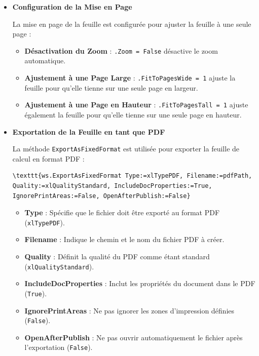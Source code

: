 \documentclass[a4paper, oneside, 12pt, final]{extreport}
\begin{document}
\begin{itemize}
La zone d'impression est définie pour couvrir l'ensemble de la plage utilisée dans la feuille de calcul :

\begin{lstlisting}
\texttt{ws.PageSetup.PrintArea = ws.UsedRange.Address}
\end{lstlisting}

Définit la zone d'impression de la feuille de calcul \texttt{ws} pour inclure toute la plage utilisée dans cette feuille. Cela garantit que toute la plage de données visible sera incluse dans le PDF exporté.

\item \textbf{Configuration de la Mise en Page}

La mise en page de la feuille est configurée pour ajuster la feuille à une seule page :

\begin{itemize}
    \item \textbf{Désactivation du Zoom} : \texttt{.Zoom = False} désactive le zoom automatique.
    \item \textbf{Ajustement à une Page Large} : \texttt{.FitToPagesWide = 1} ajuste la feuille pour qu'elle tienne sur une seule page en largeur.
    \item \textbf{Ajustement à une Page en Hauteur} : \texttt{.FitToPagesTall = 1} ajuste également la feuille pour qu'elle tienne sur une seule page en hauteur.
\end{itemize}

\item \textbf{Exportation de la Feuille en tant que PDF}

La méthode \texttt{ExportAsFixedFormat} est utilisée pour exporter la feuille de calcul en format PDF :

\begin{lstlisting}
\texttt{ws.ExportAsFixedFormat Type:=xlTypePDF, Filename:=pdfPath, Quality:=xlQualityStandard, IncludeDocProperties:=True, IgnorePrintAreas:=False, OpenAfterPublish:=False}
\end{lstlisting}

\begin{itemize}
    \item \textbf{Type} : Spécifie que le fichier doit être exporté au format PDF (\texttt{xlTypePDF}).
    \item \textbf{Filename} : Indique le chemin et le nom du fichier PDF à créer.
    \item \textbf{Quality} : Définit la qualité du PDF comme étant standard (\texttt{xlQualityStandard}).
    \item \textbf{IncludeDocProperties} : Inclut les propriétés du document dans le PDF (\texttt{True}).
    \item \textbf{IgnorePrintAreas} : Ne pas ignorer les zones d'impression définies (\texttt{False}).
    \item \textbf{OpenAfterPublish} : Ne pas ouvrir automatiquement le fichier après l'exportation (\texttt{False}).
\end{itemize}


\end{itemize}
\end{document}
